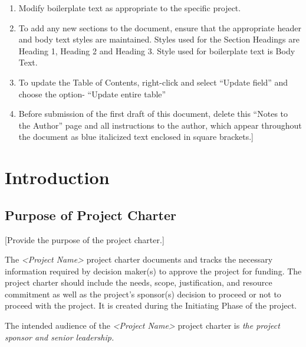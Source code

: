 \documentclass[a4paper, 11pt]{article}
\begin{document}
\begin{enumerate}
\def\labelenumi{\arabic{enumi}.}
\item
  Modify boilerplate text as appropriate to the specific project.
\item
  To add any new sections to the document, ensure that the appropriate
  header and body text styles are maintained. Styles used for the
  Section Headings are Heading 1, Heading 2 and Heading 3. Style used
  for boilerplate text is Body Text.
\item
  To update the Table of Contents, right-click and select ``Update
  field'' and choose the option- ``Update entire table''
\item
  Before submission of the first draft of this document, delete this
  ``Notes to the Author'' page and all instructions to the author, which
  appear throughout the document as blue italicized text enclosed in
  square brackets.{]}
\end{enumerate}

\newpage


\tableofcontents

\newpage


\hypertarget{introduction}{%
\section{Introduction}\label{introduction}}

\hypertarget{purpose-of-project-charter}{%
\subsection{Purpose of Project
Charter}\label{purpose-of-project-charter}}

{[}Provide the purpose of the project charter.{]}

The \emph{\textless{}Project Name\textgreater{}} project charter
documents and tracks the necessary information required by decision
maker(s) to approve the project for funding. The project charter should
include the needs, scope, justification, and resource commitment as well
as the project's sponsor(s) decision to proceed or not to proceed with
the project. It is created during the Initiating Phase of the project.

The intended audience of the \emph{\textless{}Project
Name\textgreater{}} project charter is \emph{the project sponsor and
senior leadership.}
\end{document}
